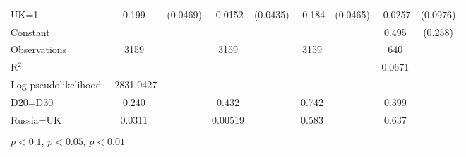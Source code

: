 \begin{tabular}{l|cccccc|cc}
UK=1            &    0.199\sym{***}& (0.0469)&  -0.0152         & (0.0435)&   -0.184\sym{***}& (0.0465)&  -0.0257         & (0.0976)\\
Constant        &                  &         &                  &         &                  &         &    0.495\sym{*}  &  (0.258)\\
\hline
Observations    &     3159         &         &     3159         &         &     3159         &         &      640         &         \\
R$^2$      &                  &         &                  &         &                  &         &       0.0671    &   \\ 
Log pseudolikelihood  & -2831.0427   &         &                  &         &                  &         &           &   \\ 
D20=D30         &    0.240         &         &    0.432         &         &    0.742         &         &    0.399         &         \\
Russia=UK       &   0.0311         &         &  0.00519         &         &    0.583         &         &    0.637         &         \\
\hline\hline
\multicolumn{9}{p{16cm}}{\tiny }\\
\multicolumn{9}{l}{\tiny \sym{*} \(p<0.1\), \sym{**} \(p<0.05\), \sym{***} \(p<0.01\)}\\
\end{tabular}